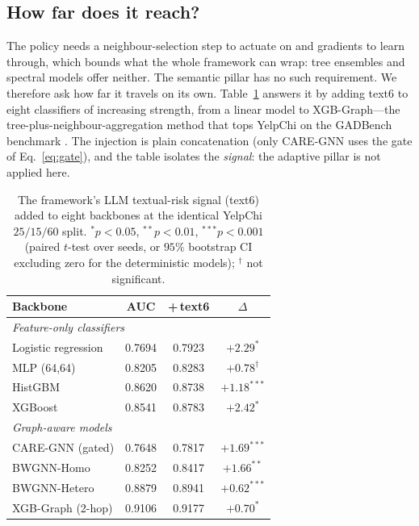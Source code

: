 \documentclass{conf}
\begin{document}
\subsection{How far does it reach?}
\label{sec:generality}

The policy needs a neighbour-selection step to actuate on and gradients to
learn through, which bounds what the whole framework can wrap: tree ensembles
and spectral models offer neither. The semantic pillar has no such requirement.
We therefore ask how far it travels on its own. Table~\ref{tab:portable} answers it by adding text6 to eight
classifiers of increasing strength, from a linear model to XGB-Graph---the
tree-plus-neighbour-aggregation method that tops YelpChi on the GADBench
benchmark \cite{tang2023gadbench}. The injection is plain concatenation (only
CARE-GNN uses the gate of Eq.~\eqref{eq:gate}), and the table isolates the
\emph{signal}: the adaptive pillar is not applied here.

\begin{table}[t]
\centering
\caption{The framework's LLM textual-risk signal (text6) added to eight
backbones at the identical YelpChi $25/15/60$ split.
$^{*}p<0.05$, $^{**}p<0.01$, $^{***}p<0.001$ (paired $t$-test over seeds, or
$95\%$ bootstrap CI excluding zero for the deterministic models);
$^{\dagger}$ not significant.}
\label{tab:portable}
\begin{tabular}{lccc}
\toprule
Backbone & AUC & \;+\,text6\; & $\Delta$ \\
\midrule
\multicolumn{4}{l}{\emph{Feature-only classifiers}}\\
Logistic regression      & 0.7694 & 0.7923 & $+2.29^{*}$ \\
MLP (64,64)              & 0.8205 & 0.8283 & $+0.78^{\dagger}$ \\
HistGBM                  & 0.8620 & 0.8738 & $+1.18^{***}$ \\
XGBoost                  & 0.8541 & 0.8783 & $+2.42^{*}$ \\
\midrule
\multicolumn{4}{l}{\emph{Graph-aware models}}\\
CARE-GNN (gated)         & 0.7648 & 0.7817 & $+1.69^{***}$ \\
BWGNN-Homo               & 0.8252 & 0.8417 & $+1.66^{**}$ \\
BWGNN-Hetero             & 0.8879 & 0.8941 & $+0.62^{***}$ \\
XGB-Graph (2-hop)        & 0.9106 & 0.9177 & $+0.70^{*}$ \\
\bottomrule
\end{tabular}
\end{table}
\end{document}
